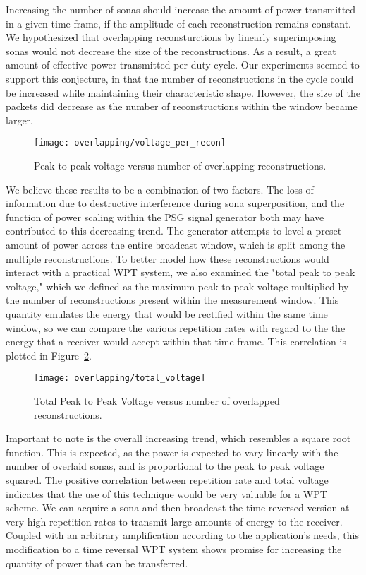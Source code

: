 Increasing the number of sonas should increase the amount of power transmitted in a given time frame, if the amplitude of each reconstruction remains constant. We hypothesized that overlapping reconsturctions by linearly superimposing sonas would not decrease the size of the reconstructions. As a result, a great amount of effective power transmitted per duty cycle. Our experiments seemed to support this conjecture, in that the number of reconstructions in the cycle could be increased while maintaining their characteristic shape. However, the size of the packets did decrease as the number of reconstructions within the window became larger.
\begin{figure}[t]
\centering
\texttt{[image: overlapping/voltage\_per\_recon]}
\caption[Max Vpp from overlapping reconstructions]{Peak to peak voltage versus number of overlapping reconstructions.}
\label{fig:overlapping-vpp}
\end{figure}
We believe these results to be a combination of two factors. The loss of information due to destructive interference during sona superposition, and the function of power scaling within the PSG signal generator both may have contributed to this decreasing trend. The generator attempts to level a preset amount of power across the entire broadcast window, which is split among the multiple reconstructions. 
To better model how these reconstructions would interact with a practical WPT system, we also examined the "total peak to peak voltage," which we defined as the maximum peak to peak voltage multiplied by the number of reconstructions present within the measurement window. This quantity emulates the energy that would be rectified within the same time window, so we can compare the various repetition rates with regard to the the energy that a receiver would accept within that time frame. This correlation is plotted in Figure~\ref{fig:overlapping-total-voltage}.

\begin{figure}[t]
\centering
\texttt{[image: overlapping/total\_voltage]}
\caption[Max Vpp from overlapped reconstructions]{Total Peak to Peak Voltage versus number of overlapped reconstructions.}
\label{fig:overlapping-total-voltage}
\end{figure}

Important to note is the overall increasing trend, which resembles a square root function. This is expected, as the power is expected to vary linearly with the number of overlaid sonas, and is proportional to the peak to peak voltage squared. The positive correlation between repetition rate and total voltage indicates that the use of this technique would be very valuable for a WPT scheme. We can acquire a sona and then broadcast the time reversed version at very high repetition rates to transmit large amounts of energy to the receiver. Coupled with an arbitrary amplification according to the application's needs, this modification to a time reversal WPT system shows promise for increasing the quantity of power that can be transferred.
